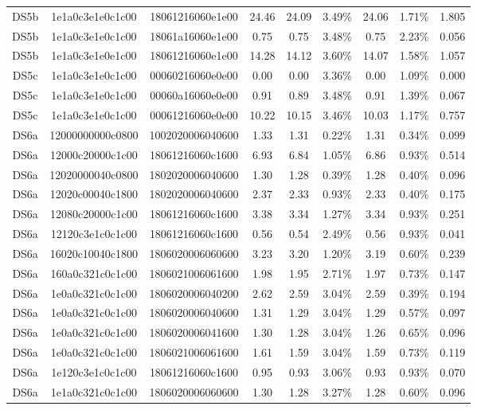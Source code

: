 \begin{tabular}{|c|c c|c|c c|c c|c|}
  DS5b & 1e1a0c3e1e0c1c00 & 18061216060e1e00 & 24.46 & 24.09 & 3.49\% & 24.06 & 1.71\% & 1.805 \\
  DS5b & 1e1a0c3e1e0c1c00 & 18061a16060e1e00 & 0.75 & 0.75 & 3.48\% & 0.75 & 2.23\% & 0.056 \\
  DS5b & 1e1a0c3e1e0e1c00 & 18061216060e1e00 & 14.28 & 14.12 & 3.60\% & 14.07 & 1.58\% & 1.057 \\
  DS5c & 1e1a0c3e1e0c1c00 & 00060216060e0e00 & 0.00 & 0.00 & 3.36\% & 0.00 & 1.09\% & 0.000 \\
  DS5c & 1e1a0c3e1e0c1c00 & 00060a16060e0e00 & 0.91 & 0.89 & 3.48\% & 0.91 & 1.39\% & 0.067 \\
  DS5c & 1e1a0c3e1e0c1c00 & 00061216060e0e00 & 10.22 & 10.15 & 3.46\% & 10.03 & 1.17\% & 0.757 \\
  DS6a & 12000000000c0800 & 1002020006040600 & 1.33 & 1.31 & 0.22\% & 1.31 & 0.34\% & 0.099 \\
  DS6a & 12000c20000c1c00 & 18061216060c1600 & 6.93 & 6.84 & 1.05\% & 6.86 & 0.93\% & 0.514 \\
  DS6a & 12020000040c0800 & 1802020006040600 & 1.30 & 1.28 & 0.39\% & 1.28 & 0.40\% & 0.096 \\
  DS6a & 12020c00040c1800 & 1802020006040600 & 2.37 & 2.33 & 0.93\% & 2.33 & 0.40\% & 0.175 \\
  DS6a & 12080c20000c1c00 & 18061216060c1600 & 3.38 & 3.34 & 1.27\% & 3.34 & 0.93\% & 0.251 \\
  DS6a & 12120c3e1c0c1c00 & 18061216060c1600 & 0.56 & 0.54 & 2.49\% & 0.56 & 0.93\% & 0.041 \\
  DS6a & 16020c10040c1800 & 1806020006060600 & 3.23 & 3.20 & 1.20\% & 3.19 & 0.60\% & 0.239 \\
  DS6a & 160a0c321c0c1c00 & 1806021006061600 & 1.98 & 1.95 & 2.71\% & 1.97 & 0.73\% & 0.147 \\
  DS6a & 1e0a0c321c0c1c00 & 1806020006040200 & 2.62 & 2.59 & 3.04\% & 2.59 & 0.39\% & 0.194 \\
  DS6a & 1e0a0c321c0c1c00 & 1806020006040600 & 1.31 & 1.29 & 3.04\% & 1.29 & 0.57\% & 0.097 \\
  DS6a & 1e0a0c321c0c1c00 & 1806020006041600 & 1.30 & 1.28 & 3.04\% & 1.26 & 0.65\% & 0.096 \\
  DS6a & 1e0a0c321c0c1c00 & 1806021006061600 & 1.61 & 1.59 & 3.04\% & 1.59 & 0.73\% & 0.119 \\
  DS6a & 1e120c3e1c0c1c00 & 18061216060c1600 & 0.95 & 0.93 & 3.06\% & 0.93 & 0.93\% & 0.070 \\
  DS6a & 1e1a0c321c0c1c00 & 1806020006060600 & 1.30 & 1.28 & 3.27\% & 1.28 & 0.60\% & 0.096 \\

\end{tabular}
